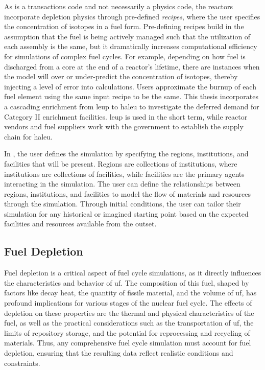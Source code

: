 As \cyclus is a transactions code and not necessarily a physics code,
the reactors incorporate depletion physics through pre-defined \textit{recipes},
where the user specifies the concentration of isotopes in a fuel form.
Pre-defining recipes build in the assumption that the fuel is being actively
managed such that the utilization of each assembly is the same, but it
dramatically increases computational efficiency for simulations of complex fuel
cycles. For example, depending on how fuel is discharged from a core at the end
of a reactor's lifetime, there are instances when the model will over or
under-predict the concentration of isotopes, thereby injecting a level of error
into calculations. Users approximate the burnup of each fuel element using the
same input recipe to be the same. This thesis incorporates a cascading
enrichment from \gls{leup} to \gls{haleu} to investigate the deferred demand
for Category II enrichment facilities. \gls{leup} is used in the short term,
while reactor vendors and fuel suppliers work with the government to establish
the supply chain for \gls{haleu}.


In \cyclus, the user defines the simulation by specifying the regions,
institutions, and facilities that will be present. Regions
are collections of institutions, where institutions are collections of
facilities, while facilities are the primary agents interacting in the
simulation. The user can define the relationships between regions,
institutions, and facilities to model the flow of materials and resources
through the simulation. Through initial conditions, the user can tailor their
simulation for any historical or imagined starting point based on the expected
facilities and resources available from the outset.

\subsection{Fuel Depletion}
\label{sec:depletion}

Fuel depletion is a critical aspect of fuel cycle simulations, as it directly
influences the characteristics and behavior of \gls{uf}. The composition of
this fuel, shaped by factors like decay heat, the quantity of fissile material,
and the volume of \gls{uf}, has profound implications for various stages of the
nuclear fuel cycle. The effects of depletion on these properties are the
thermal and physical characteristics of the fuel, as well as the practical
considerations such as the transportation of \gls{uf}, the limits of repository
storage, and the potential for reprocessing and recycling of materials. Thus,
any comprehensive fuel cycle simulation must account for fuel depletion,
ensuring that the resulting data reflect realistic conditions and constraints.

